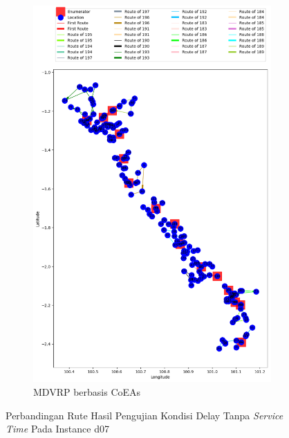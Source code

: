\begin{figure}[H]
	\centering
	\begin{subfigure}[t]{\textwidth}
		\centering
		\includegraphics[width=\textwidth]{Resources/Images/delayed_7/real_m15_n100_delayed_7_coes}
		\caption{MDVRP berbasis CoEAs}
		\label{fig:real_m15_n100_delayed_7_coes}
	\end{subfigure}
	\caption{Perbandingan Rute Hasil Pengujian Kondisi Delay Tanpa \textit{Service Time} Pada Instance d07}
	\label{fig:real_m15_n100_delayed_7}
\end{figure}


